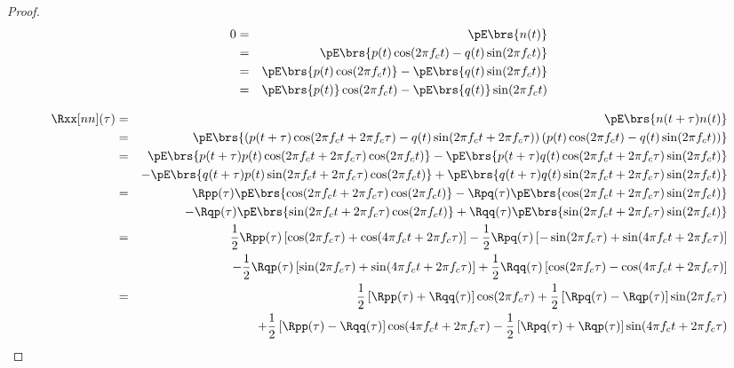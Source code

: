 \begin{proof}
\begin{eqnarray*}
   0 &=& \pE\brs{n(t)}
   \\&=& \pE\brs{p(t)\cos(2\pi f_ct) - q(t)\sin(2\pi f_c t)}
   \\&=& \pE\brs{p(t)\cos(2\pi f_ct)} - \pE\brs{q(t)\sin(2\pi f_c t)}
   \\&=& \pE\brs{p(t)}\cos(2\pi f_ct) - \pE\brs{q(t)}\sin(2\pi f_c t)
\end{eqnarray*}

\begin{eqnarray*}
   \Rxx[nn](\tau)
     &=& \pE\brs{n(t+\tau)n(t)}
   \\&=& \pE\brs{
         \left( p(t+\tau)\cos(2\pi f_ct + 2\pi f_c\tau) - q(t) \sin(2\pi f_ct + 2\pi f_c\tau)  \right)
         \left( p(t     )\cos(2\pi f_ct               ) - q(t) \sin(2\pi f_ct               )  \right)
         }
   \\&=& \pE\brs{ p(t+\tau)p(t) \cos(2\pi f_ct + 2\pi f_c\tau) \cos(2\pi f_ct) }
        -\pE\brs{ p(t+\tau)q(t) \cos(2\pi f_ct + 2\pi f_c\tau) \sin(2\pi f_ct) }
   \\&& -\pE\brs{ q(t+\tau)p(t) \sin(2\pi f_ct + 2\pi f_c\tau) \cos(2\pi f_ct) }
        +\pE\brs{ q(t+\tau)q(t) \sin(2\pi f_ct + 2\pi f_c\tau) \sin(2\pi f_ct) }
%
   \\&=& \Rpp(\tau) \pE\brs{ \cos(2\pi f_ct + 2\pi f_c\tau) \cos(2\pi f_ct) }
        -\Rpq(\tau) \pE\brs{ \cos(2\pi f_ct + 2\pi f_c\tau) \sin(2\pi f_ct) }
   \\&& -\Rqp(\tau) \pE\brs{ \sin(2\pi f_ct + 2\pi f_c\tau) \cos(2\pi f_ct) }
        +\Rqq(\tau) \pE\brs{ \sin(2\pi f_ct + 2\pi f_c\tau) \sin(2\pi f_ct) }
%
   \\&=& \frac{1}{2} \Rpp(\tau) \left[ \cos(2\pi f_c\tau) + \cos(4\pi f_ct + 2\pi f_c\tau) \right]
        -\frac{1}{2} \Rpq(\tau) \left[-\sin(2\pi f_c\tau) + \sin(4\pi f_ct + 2\pi f_c\tau) \right]
   \\&& -\frac{1}{2} \Rqp(\tau) \left[ \sin(2\pi f_c\tau) + \sin(4\pi f_ct + 2\pi f_c\tau) \right]
        +\frac{1}{2} \Rqq(\tau) \left[ \cos(2\pi f_c\tau) - \cos(4\pi f_ct + 2\pi f_c\tau) \right]
%
   \\&=& \frac{1}{2}\left[ \Rpp(\tau) + \Rqq(\tau)\right] \cos(2\pi f_c\tau)
        +\frac{1}{2}\left[ \Rpq(\tau) - \Rqp(\tau)\right] \sin(2\pi f_c\tau)
   \\&& +\frac{1}{2}\left[ \Rpp(\tau) - \Rqq(\tau)\right] \cos(4\pi f_ct + 2\pi f_c\tau)
        -\frac{1}{2}\left[ \Rpq(\tau) + \Rqp(\tau)\right] \sin(4\pi f_ct + 2\pi f_c\tau)
\end{eqnarray*}


\end{proof}
